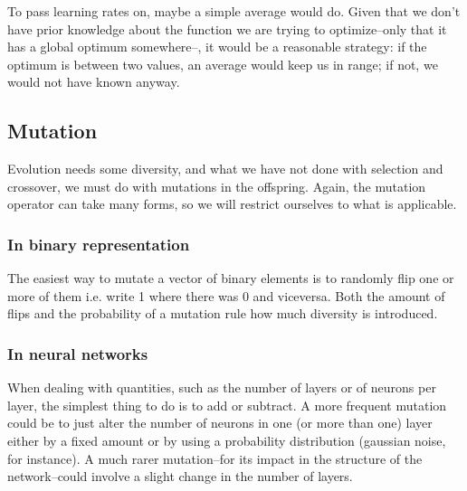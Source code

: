 			To pass learning rates on, maybe a simple average would do. Given that we don't have prior knowledge about the function we are trying to optimize--only that it has a global optimum somewhere--, it would be a reasonable strategy: if the optimum is between two values, an average would keep us in range; if not, we would not have known anyway.

\newpage

	\subsection{Mutation}

		Evolution needs some diversity, and what we have not done with selection and crossover, we must do with mutations in the offspring.
		Again, the mutation operator can take many forms, so we will restrict ourselves to what is applicable.

		\subsubsection{In binary representation}

			The easiest way to mutate a vector of binary elements is to randomly flip one or more of them i.e. write 1 where there was 0 and viceversa. Both the amount of flips and the probability of a mutation rule how much diversity is introduced.

		\subsubsection{In neural networks}

			When dealing with quantities, such as the number of layers or of neurons per layer, the simplest thing to do is to add or subtract. A more frequent mutation could be to just alter the number of neurons in one (or more than one) layer either by a fixed amount or by using a probability distribution (gaussian noise, for instance). A much rarer mutation--for its impact in the structure of the network--could involve a slight change in the number of layers.